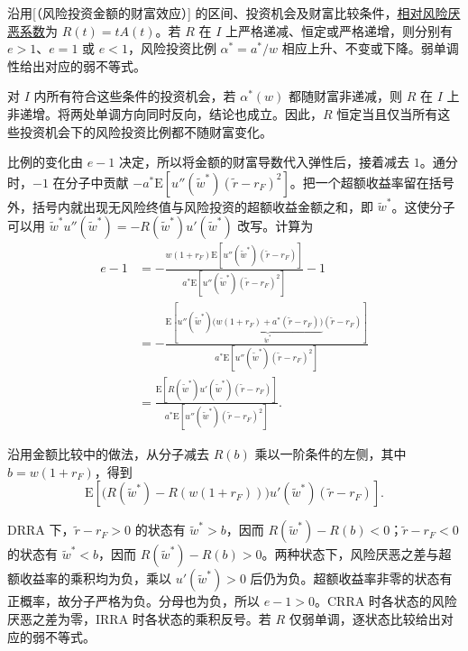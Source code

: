 \begin{tcolorbox}[knowledge]
 沿用[（风险投资金额的财富效应）] 的区间、投资机会及财富比较条件，\hyperlink{wj-relative-risk-aversion}{\textcolor{WJReferenceColor}{相对风险厌恶系数}}为 $R(t)=tA(t)$。若 $R$ 在 $I$ 上严格递减、恒定或严格递增，则分别有 $e>1$、$e=1$ 或 $e<1$，风险投资比例 $\alpha^*=a^*/w$ 相应上升、不变或下降。弱单调性给出对应的弱不等式。

对 $I$ 内所有符合这些条件的投资机会，若 $\alpha^*(w)$ 都随财富非递减，则 $R$ 在 $I$ 上非递增。将两处单调方向同时反向，结论也成立。因此，$R$ 恒定当且仅当所有这些投资机会下的风险投资比例都不随财富变化。
\end{tcolorbox}
\begin{solution}[label-content={证明},blank-type=none]
比例的变化由 $e-1$ 决定，所以将金额的财富导数代入弹性后，接着减去 $1$。通分时，$-1$ 在分子中贡献
$-a^*\mathrm E[u''(\tilde w^*)(\tilde r-r_F)^2]$。把一个超额收益率留在括号外，括号内就出现无风险终值与风险投资的超额收益金额之和，即 $\tilde w^*$。这使分子可以用 $\tilde w^*u''(\tilde w^*)=-R(\tilde w^*)u'(\tilde w^*)$ 改写。计算为
\[
\begin{aligned}
 e-1
 &=-\frac{w(1+r_F)\mathrm E[u''(\tilde w^*)(\tilde r-r_F)]}
          {a^*\mathrm E[u''(\tilde w^*)(\tilde r-r_F)^2]}-1\\
 &=-\frac{\mathrm E\!\left[u''(\tilde w^*)
       \underbrace{\bigl(w(1+r_F)+a^*(\tilde r-r_F)\bigr)}_{\tilde w^*}
       (\tilde r-r_F)\right]}
          {a^*\mathrm E[u''(\tilde w^*)(\tilde r-r_F)^2]}\\
 &=\frac{\mathrm E[R(\tilde w^*)u'(\tilde w^*)(\tilde r-r_F)]}
         {a^*\mathrm E[u''(\tilde w^*)(\tilde r-r_F)^2]}.
\end{aligned}
\]

沿用金额比较中的做法，从分子减去 $R(b)$ 乘以一阶条件的左侧，其中 $b=w(1+r_F)$，得到
\[
 \mathrm E\!\left[\bigl(R(\tilde w^*)-R(w(1+r_F))\bigr)
 u'(\tilde w^*)(\tilde r-r_F)\right].
\]

DRRA 下，$\tilde r-r_F>0$ 的状态有 $\tilde w^*>b$，因而 $R(\tilde w^*)-R(b)<0$；$\tilde r-r_F<0$ 的状态有 $\tilde w^*<b$，因而 $R(\tilde w^*)-R(b)>0$。两种状态下，风险厌恶之差与超额收益率的乘积均为负，乘以 $u'(\tilde w^*)>0$ 后仍为负。超额收益率非零的状态有正概率，故分子严格为负。分母也为负，所以 $e-1>0$。CRRA 时各状态的风险厌恶之差为零，IRRA 时各状态的乘积反号。若 $R$ 仅弱单调，逐状态比较给出对应的弱不等式。
\end{solution}

